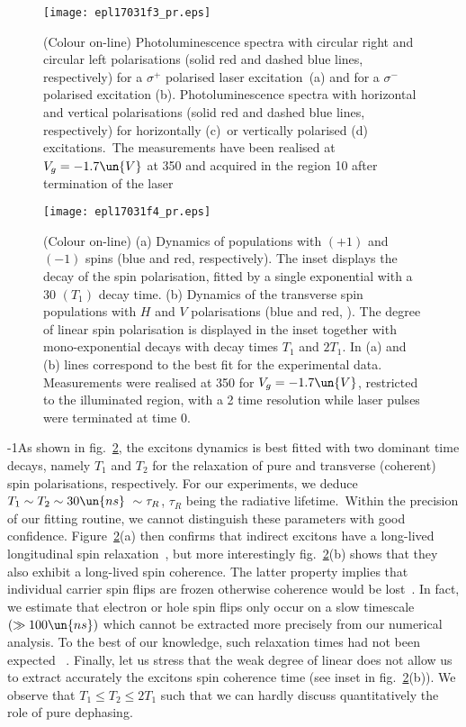 \documentclass[doublecol,final]{epl2}
\begin{document}
\begin{figure}%
\centering\texttt{[image: epl17031f3\_pr.eps]}
\caption{(Colour on-line) Photoluminescence spectra with circular right and circular left polarisations (solid red and dashed blue lines, respectively) for a $\sigma^+$ polarised laser excitation~(a) and for a $\sigma^-$ polarised excitation (b). Photoluminescence spectra with horizontal and vertical polarisations (solid red and dashed blue lines, respectively) for horizontally (c)~or vertically polarised (d) excitations.~The measurements have been realised at $V_g =-1.7\un{V}$ at 350 and acquired in the  region 10 after termination of the laser }
\label{epl17031fig3}
\end{figure}

\begin{figure}%
\centering\texttt{[image: epl17031f4\_pr.eps]}
\caption{(Colour on-line) (a) Dynamics of populations with $(+1)$ and $(-1)$ spins (blue and red, respectively). The inset displays the decay of the spin polarisation, fitted by a single exponential with a 30 $(T_1)$ decay time. (b) Dynamics of the transverse spin populations with $H$ and $V$ polarisations (blue and red, ). The degree of linear spin polarisation is displayed in the inset together with mono-exponential decays with decay times $T_1$ and $2T_1$. In (a) and (b) lines correspond to the best fit for the experimental data. Measurements were realised at 350 for $V_g= -1.7\un{V}$, restricted to the illuminated region, with a 2 time resolution while laser pulses were terminated at time 0.}
\label{epl17031fig4}
\vspace*{-10pt}
\end{figure}

\looseness-1As shown in fig.~\ref{epl17031fig4}, the excitons dynamics is best fitted with two dominant time decays, namely $T_1$ and $T_2$ for the relaxation of pure and transverse (coherent) spin polarisations, respectively. For our experiments, we deduce $T_1 \sim T_2 \sim 30\un{ns} \ \sim\tau_R$, $\tau_R$ being the radiative lifetime.~Within the precision of our fitting routine, we cannot distinguish these parameters with good confidence. Figure~\ref{epl17031fig4}(a) then confirms that indirect excitons have a long-lived longitudinal spin relaxation~\cite{epl17031bib14,epl17031bib15}, but more interestingly fig.~\ref{epl17031fig4}(b) shows that they also exhibit a long-lived spin coherence. The latter property implies that individual carrier spin flips are frozen otherwise coherence would be lost~\cite{epl17031bib4}. In fact, we estimate that electron or hole spin flips only occur on a slow timescale $(\gg 100\un{ns})$ which cannot be extracted more precisely from our numerical analysis. To the best of our knowledge, such  relaxation times had not been expected ~\cite{epl17031bib25}. Finally, let us stress that the weak degree of linear  does not allow us to extract accurately the excitons spin coherence time (see inset in fig.~\ref{epl17031fig4}(b)). We observe that $T_1\leq T_2\leq 2T_1$ such that we can hardly discuss quantitatively the role of pure dephasing.
\end{document}
